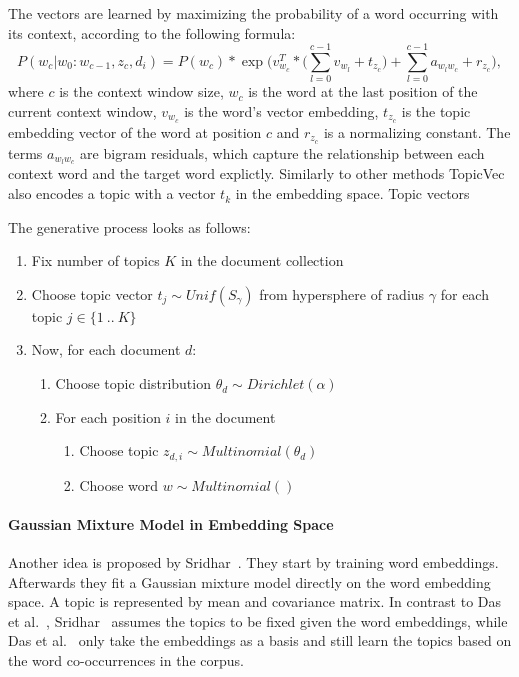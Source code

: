 \documentclass[
        a4paper,
        titlepage,
        twoside,
        parskip
        ]{scrbook}
\theoremstyle{break}
\begin{document}
The vectors are learned by maximizing the probability of a word occurring with its context, according to the following formula:
\begin{equation*}
  P(w_c | w_0 : w_{c - 1}, z_c, d_i) = P(w_c) * \exp \bigg( v_{w_{c}}^T * \Big( \sum\limits_{l=0}^{c-1} v_{w_l} + t_{z_c} \Big) + \sum\limits_{l=0}^{c - 1} a_{w_{l} w_c}  + r_{z_c} \bigg),
\end{equation*}
where $c$ is the context window size, $w_c$ is the word at the last position of the current context window, $v_{w_c}$ is the word's vector embedding, $t_{z_c}$ is the topic embedding vector of the word at position $c$ and $r_{z_c}$ is a normalizing constant.
The terms $a_{w_l w_c}$ are bigram residuals, which capture the relationship between each context word and the target word explictly.
Similarly to other methods TopicVec also encodes a topic with a vector $t_k$ in the embedding space.
Topic vectors


The generative process looks as follows:
\begin{enumerate}
    \item Fix number of topics $K$ in the document collection
    \item Choose topic vector $t_j \sim Unif(S_{\gamma})$ from hypersphere of radius $\gamma$ for each topic $j \in \{1~..~K\}$
    \item Now, for each document $d$:
    \begin{enumerate}
        \item Choose topic distribution $\theta_d \sim Dirichlet(\alpha)$
        \item For each position $i$ in the document
        \begin{enumerate}
            \item Choose topic $z_{d,i} \sim Multinomial(\theta_d)$
            \item Choose word $w \sim Multinomial()$
        \end{enumerate}
    \end{enumerate}
\end{enumerate}


\paragraph{Gaussian Mixture Model in Embedding Space}
Another idea is proposed by Sridhar~\cite{Sridhar2015}.
They start by training word embeddings.
Afterwards they fit a Gaussian mixture model directly on the word embedding space.
A topic is represented by mean and covariance matrix.
In contrast to Das et al.~\cite{Das2015}, Sridhar~\cite{Sridhar2015} assumes the topics to be fixed given the word embeddings, while Das et al.~\cite{Das2015} only take the embeddings as a basis and still learn the topics based on the word co-occurrences in the corpus.
\end{document}
